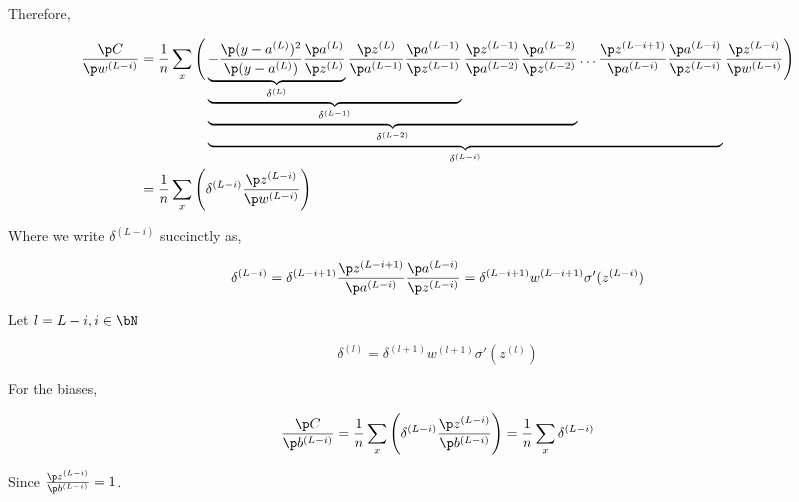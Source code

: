 \documentclass{homework}
\begin{document}
Therefore,

\begin{align*}
  \frac{\p C}{\p w^{(L-i)}}
  & = \frac{1}{n} \sum_x \Bigg(
    \underbrace{\underbrace{\underbrace{\underbrace{-\frac{\p (y-a^{(L)})^2}{\p (y-a^{(L)})} \frac{\p a^{(L)}}{\p z^{(L)}}}_{\delta^{(L)}}
    \frac{\p z^{(L)}}{\p a^{(L-1)}} \frac{\p a^{(L-1)}}{\p z^{(L-1)}}}_{\delta^{(L-1)}}
    \frac{\p z^{(L-1)}}{\p a^{(L-2)}}\frac{\p a^{(L-2)}}{\p z^{(L-2)}}}_{\delta^{(L-2)}}
    \hdots
    \frac{\p z^{(L-i+1)}}{\p a^{(L-i)}}\frac{\p a^{(L-i)}}{\p z^{(L-i)}}}_{\delta^{(L-i)}}
    \frac{\p z^{(L-i)}}{\p w^{(L-i)}} \Bigg)\\
    & = \frac{1}{n} \sum_x \Bigg( \delta^{(L-i)} \frac{\p z^{(L-i)}}{\p w^{(L-i)}} \Bigg) \\
\end{align*}

Where we write $\delta^{(L-i)}$ succinctly as,

\[
  \delta^{(L-i)} = \delta^{(L-i+1)}\frac{\p z^{(L-i+1)}}{\p a^{(L-i)}}\frac{\p a^{(L-i)}}{\p z^{(L-i)}}
  = \delta^{(L-i+1)}w^{(L-i+1)}\sigma'(z^{(L-i)})
\]

Let $l = L-i, i \in \bN$

\[
  \delta^{(l)} = \delta^{(l+1)}w^{(l+1)}\sigma'(z^{(l)})
\]

For the biases,

\[
  \frac{\p C}{\p b^{(L-i)}} = \frac{1}{n} \sum_x \Bigg( \delta^{(L-i)} \frac{\p z^{(L-i)}}{\p b^{(L-i)}} \Bigg)
  = \frac{1}{n} \sum_x \delta^{(L-i)}
\]

Since $\frac{\p z^{(L-i)}}{\p b^{(L-i)}} = 1$.
\end{document}
